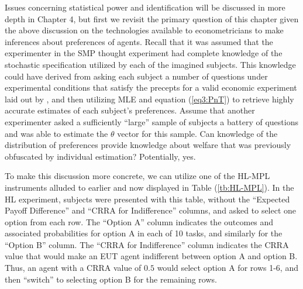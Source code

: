 \documentclass[../main.tex]{subfiles}
\begin{document}
Issues concerning statistical power and identification will be discussed in more depth in Chapter 4, but first we revisit the primary question of this chapter given the above discussion on the technologies available to econometricians to make inferences about preferences of agents.
Recall that it was assumed that the experimenter in the SMP thought experiment had complete knowledge of the stochastic specification utilized by each of the imagined subjects.
This knowledge could have derived from asking each subject a number of questions under experimental conditions that satisfy the precepts for a valid economic experiment laid out by \textcite{Smith1982}{\footnotemark}, and then utilizing MLE and equation (\ref{eq3:PnT}) to retrieve highly accurate estimates of each subject's preferences.
Assume that another experimenter asked a sufficiently \enquote{large} sample of subjects a battery of questions and was able to estimate the $\theta$ vector for this sample.
Can knowledge of the distribution of preferences provide knowledge about welfare that was previously obfuscated by individual estimation? 
Potentially, yes.

\addtocounter{footnote}{-1}

To make this discussion more concrete, we can utilize one of the HL-MPL instruments alluded to earlier and now displayed in Table (\ref{tb:HL-MPL}).
In the HL experiment, subjects were presented with this table, without the \enquote{Expected Payoff Difference} and \enquote{CRRA for Indifference} columns, and asked to select one option from each row.
The \enquote{Option A} column indicates the outcomes and associated probabilities for option A in each of 10 tasks, and similarly for the \enquote{Option B} column.
The \enquote{CRRA for Indifference} column indicates the CRRA value that would make an EUT agent indifferent between option A and option B.
Thus, an agent with a CRRA value of $0.5$ would select option A for rows 1-6, and then \enquote{switch} to selecting option B for the remaining rows.
\end{document}
